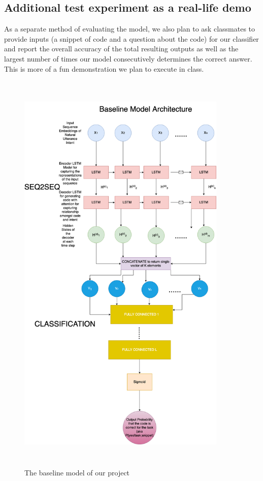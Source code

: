 \documentclass[11pt,a4paper]{article}
\begin{document}
\subsection{Additional test experiment as a real-life demo}
As a separate method of evaluating the model, we also plan to ask classmates to provide inputs (a snippet of code and a question about the code) for our classifier and report the overall accuracy of the total resulting outputs as well as the largest number of times our model consecutively determines the correct answer. This is more of a fun demonstration we plan to execute in class.

\begin{figure}
    \centering
    \includegraphics[height=20cm,width=10cm]{ModelArchitecture.png}
    \caption{The baseline model of our project}
    \label{fig:my_label}
\end{figure}
\end{document}
